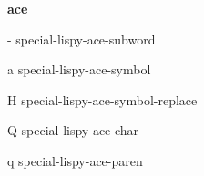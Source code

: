 \documentclass[a4paper,10pt]{article}
\renewcommand\section[1]{\bigskip\par\textbf{\large#1}\medskip}
\newcommand\keyify[1]{\keys{\ttfamily#1}}
\begin{document}
\setlength{\columnsep}{0.3cm}

\begin{multicols*}{3}


\section{ace}
\begin{keylist}[labelwidth=\widthof{\keyify{-}}]
	\item[-] special-lispy-ace-subword
	\item[a] special-lispy-ace-symbol
	\item[H] special-lispy-ace-symbol-replace
	\item[Q] special-lispy-ace-char
	\item[q] special-lispy-ace-paren
\end{keylist}



\end{multicols*}
\end{document}
